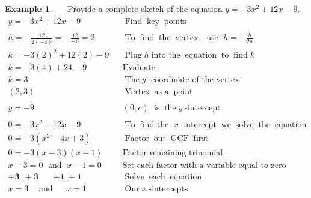 \documentclass[12pt]{book}
\theoremstyle{definition}
\newtheorem{example}{Example}
\newcommand{\tmmathbf}[1]{\ensuremath{\boldsymbol{#1}}}
\newcommand{\tmop}[1]{\ensuremath{\operatorname{#1}}}
\begin{document}
\begin{example}~~~Provide a complete sketch of the equation $y = - 3 x^2 + 12 x - 9$.
  \begin{eqnarray*}
    y = - 3 x^2 + 12 x - 9 &  & \tmop{Find} \tmop{key} \tmop{points}\\
    &  & \\
    h = -\frac{12}{2 (- 3)} = -\frac{12}{- 6} = 2 &  & \tmop{To} \tmop{find}
    \tmop{the} \tmop{vertex}, \tmop{use~} h = -\frac{b}{2 a}\\
    k = - 3 (2)^2 + 12 (2) - 9 &  & \tmop{Plug} h \tmop{into~the} \tmop{equation} \tmop{to} \tmop{find} k\\
    k = - 3 (4) + 24 - 9 &  & \tmop{Evaluate}\\
    k = 3 &  & \tmop{The} y \tmop{-coordinate~of~the~vertex}\\
    (2, 3) &  & \tmop{Vertex} \tmop{as~a} \tmop{point}\\
    &  &\\
		y = -9 &  & (0,c) \tmop{~is} \tmop{the} y \tmop{-intercept}\\
    & &\\
    0 = - 3 x^2 + 12 x - 9 &  & \tmop{To} \tmop{find~the~} x \tmop{-intercept}
    \tmop{we} \tmop{solve} \tmop{the} \tmop{equation}\\
    0 = - 3 (x^2 - 4 x + 3) &  & \tmop{Factor} \tmop{out} \tmop{GCF}
    \tmop{first}\\
		0 = - 3 (x - 3) (x - 1) &  & \tmop{Factor~remaining~trinomial}\\
    x - 3 = 0 \tmop{~and~} x - 1 = 0~~ &  & \tmop{Set~each~factor~with~a~variable~equal~to~zero}\\
		\tmmathbf{\underline{+ 3 ~~+ 3} ~~~~~~~~ \underline{+ 1 ~+ 1}} &  & \tmop{Solve} \tmop{each}
    \tmop{equation}\\
    x =  3 \tmop{~~~and~~~~} x =  1~~ &  & \tmop{Our} x\tmop{-intercepts}%
		\end{eqnarray*}
  \end{example}
\end{document}
